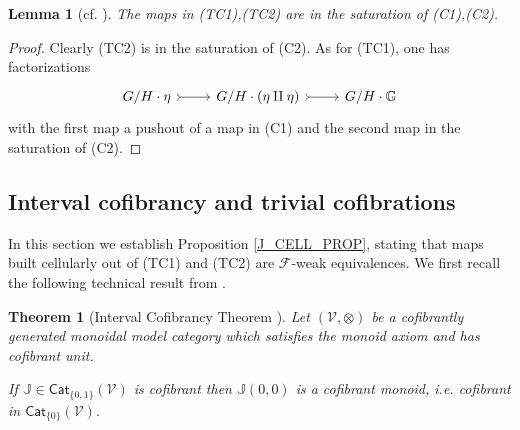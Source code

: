 \documentclass[a4paper,10pt
,draft
]{article}%
\numberwithin{equation}{section}
\numberwithin{figure}{section}
\newtheorem{theorem}[equation]{Theorem}%
\newtheorem{lemma}[equation]{Lemma}%
\theoremstyle{definition} %
\newtheorem{remark}[equation]{Remark}%
\newcommand{\F}{\ensuremath{\mathcal F}}
\newcommand{\V}{\ensuremath{\mathcal V}}
\newcommand{\1}{\ensuremath{\mathbbm 1}}%
\begin{document}




\begin{lemma}[{cf. \cite[1.19]{CM13b}}]\label{POINT_4_LEMMA}
	The maps in (TC1),(TC2) are in the saturation of (C1),(C2).
\end{lemma}

\begin{proof}
	Clearly (TC2) is in the saturation of (C2).
	As for (TC1), one has factorizations
\begin{equation}
	\begin{tikzcd}
	G/H \cdot \eta \arrow[r, rightarrowtail]
&
	G/H \cdot (\eta \amalg \eta) \arrow[r, rightarrowtail]
&
	G/H \cdot \mathbb{G}
	\end{tikzcd}
\end{equation}
with the first map a pushout of a map in (C1) and 
the second map in the saturation of (C2).
\end{proof}





\subsection{Interval cofibrancy and trivial cofibrations}
\label{TRIVCOF_SEC}


In this section we establish Proposition \ref{J_CELL_PROP},
stating that maps built cellularly out of
(TC1) and (TC2) are $\F$-weak equivalences.
We first recall the following
technical result from \cite{BM13}.


\begin{theorem}
[Interval Cofibrancy Theorem {\cite[Thm. 1.15]{BM13}}]
\label{INTCOF THM}
Let $(\V,\otimes)$ be a cofibrantly generated monoidal model category which
satisfies the monoid axiom and has cofibrant unit.

If $\mathbb{J} \in \mathsf{Cat}_{\{0,1\}}(\V)$
is cofibrant then 
$\mathbb{J}(0,0)$ 
is a cofibrant monoid, i.e. cofibrant
in $ \mathsf{Cat}_{\{0\}}(\V)$.
\end{theorem}
\end{document}
